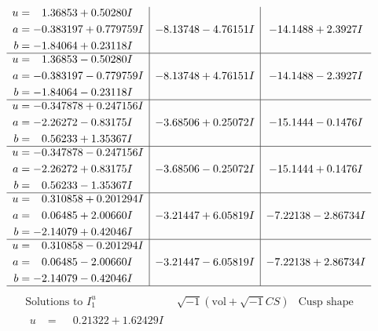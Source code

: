 \documentclass[1p]{elsarticle_modified}
\theoremstyle{definition}
\newcommand{\I}{\sqrt{-1}}
\begin{document}
$$\begin{array}{c|c|c}
\begin{aligned}
u &= \phantom{-}1.36853 + 0.50280 I \\
a &= -0.383197 + 0.779759 I \\
b &= -1.84064 + 0.23118 I\end{aligned}
 & -8.13748 - 4.76151 I & -14.1488 + 2.3927 I \\ \hline\begin{aligned}
u &= \phantom{-}1.36853 - 0.50280 I \\
a &= -0.383197 - 0.779759 I \\
b &= -1.84064 - 0.23118 I\end{aligned}
 & -8.13748 + 4.76151 I & -14.1488 - 2.3927 I \\ \hline\begin{aligned}
u &= -0.347878 + 0.247156 I \\
a &= -2.26272 - 0.83175 I \\
b &= \phantom{-}0.56233 + 1.35367 I\end{aligned}
 & -3.68506 + 0.25072 I & -15.1444 - 0.1476 I \\ \hline\begin{aligned}
u &= -0.347878 - 0.247156 I \\
a &= -2.26272 + 0.83175 I \\
b &= \phantom{-}0.56233 - 1.35367 I\end{aligned}
 & -3.68506 - 0.25072 I & -15.1444 + 0.1476 I \\ \hline\begin{aligned}
u &= \phantom{-}0.310858 + 0.201294 I \\
a &= \phantom{-}0.06485 + 2.00660 I \\
b &= -2.14079 + 0.42046 I\end{aligned}
 & -3.21447 + 6.05819 I & -7.22138 - 2.86734 I \\ \hline\begin{aligned}
u &= \phantom{-}0.310858 - 0.201294 I \\
a &= \phantom{-}0.06485 - 2.00660 I \\
b &= -2.14079 - 0.42046 I\end{aligned}
 & -3.21447 - 6.05819 I & -7.22138 + 2.86734 I\\
 \hline 
 \end{array}$$\newpage$$\begin{array}{c|c|c}  
\text{Solutions to }I^u_{1}& \I (\text{vol} + \sqrt{-1}CS) & \text{Cusp shape}\\
 \hline 
\begin{aligned}
u &= \phantom{-}0.21322 + 1.62429 I \\

\end{aligned}
\end{array}$$
\end{document}
